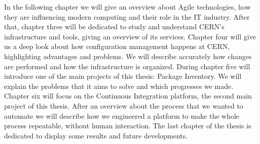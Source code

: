 In the following chapter we will give an overview about Agile
technologies, how they are influencing modern computing and their role in
the IT industry. After that, chapter three will be dedicated to study and
understand CERN's infrastructure and tools, giving an overview of its
services. Chapter four will give us a deep look about how configuration
management happens at CERN, highlighting advantages and problems. We will
describe accurately how changes are performed and how the infrastructure
is organized. During chapter five will introduce one of the main projects
of this thesis: Package Inventory. We will explain the problems that it
aims to solve and which progresses we made. Chapter six will focus on the
Continuous Integration platform, the second main project of this thesis.
After an overview about the process that we wanted to automate we will
describe how we engineered a platform to make the whole process
repeatable, without human interaction. The last chapter of the thesis is
dedicated to display some results and future developments.
